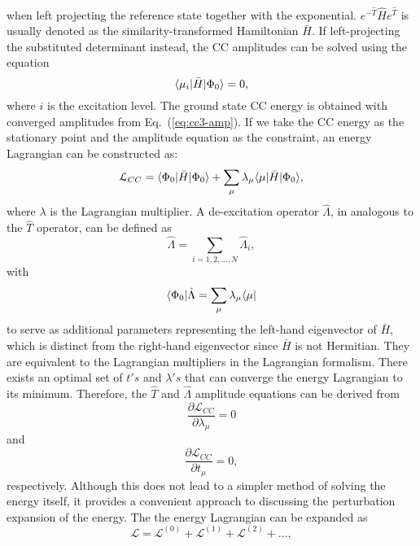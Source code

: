 when left projecting the reference state together with the exponential. $e^{-\hat{T}}\hat{H}e^{\hat{T}}$ is usually denoted as the similarity-transformed Hamiltonian $\bar{H}$. If left-projecting the substituted determinant instead, the CC amplitudes can be solved using the equation
\begin{equation}
\langle\mu_{i} |\bar{H}| \Phi_{0} \rangle=0,
\label{eq:cc3-amp}
\end{equation}
where $i$ is the excitation level. The ground state CC energy is obtained with converged amplitudes from Eq.~(\ref{eq:cc3-amp}). If we take the CC energy as the stationary point and the amplitude equation as the constraint, an energy Lagrangian can be constructed as:
\begin{equation}
\mathcal{L}_{CC} = \langle\Phi_{0} |\bar{H}| \Phi_{0} \rangle + \sum_{\mu}\lambda_{\mu}\langle\mu |\bar{H}| \Phi_{0} \rangle,
\label{eq:cc3-lag}
\end{equation}
where $\lambda$ is the Lagrangian multiplier. A de-excitation operator $\hat{\Lambda}$, in analogous to the $\hat{T}$ operator, can be defined as
\begin{equation}
\hat{\Lambda}=\sum_{i=1, 2, ..., N}\hat{\Lambda}_{i},
\end{equation}
with
\begin{equation}
\langle\Phi_{0} |\hat{\Lambda}=\sum_{\mu}\lambda_{\mu}\langle\mu |
\end{equation}
to serve as additional parameters representing the left-hand eigenvector of $\bar{H}$, which is distinct from the right-hand eigenvector since $\bar{H}$ is not Hermitian. They are equivalent to the Lagrangian multipliers in the Lagrangian formalism. There exists an optimal set of $t's$ and $\lambda's$ that can converge the energy Lagrangian to its minimum. Therefore, the $\hat{T}$ and $\hat{\Lambda}$ amplitude equations can be derived from 
\begin{equation}
\frac{\partial \mathcal{L}_{CC}}{\partial \lambda_{\mu}}=0
\label{eq:cc3-lag-t-eq}
\end{equation}
and
\begin{equation}
\frac{\partial \mathcal{L}_{CC}}{\partial t_{\mu}}=0,
\label{eq:cc3-lag-l-eq}
\end{equation}
respectively.
Although this does not lead to a simpler method of solving the energy itself, it provides a convenient approach to discussing the perturbation expansion of the energy. The the energy Lagrangian can be expanded as 
\begin{equation}
\mathcal{L} = \mathcal{L}^{(0)} + \mathcal{L}^{(1)} + \mathcal{L}^{(2)} + ...,
\end{equation}
